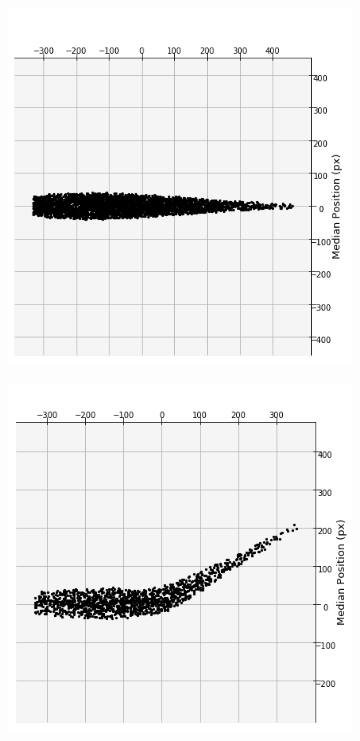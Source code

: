\begin{figure}[ht] \label{ fig7} 
\captionsetup[subfigure]{labelformat=empty}
  \begin{subfigure}[b]{0.5\linewidth}
    \includegraphics[width = 1 \linewidth]{figures/final_fish_straight_median.PNG} 
  \end{subfigure} 
  \begin{subfigure}[b]{0.5\linewidth}
    \includegraphics[width = 0.99 \linewidth]{figures/final_fish_turned_median.png} 

\end{subfigure}
\end{figure}
